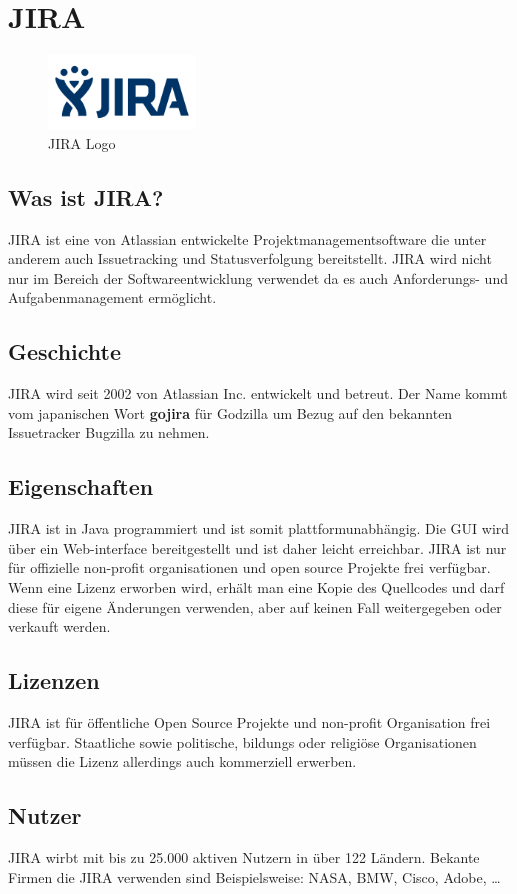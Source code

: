 \section{JIRA}
\begin{figure}[htbp]
        \centering
                \includegraphics[width=0.35\textwidth]{./JIRA_logo.png}
        \caption{JIRA Logo}
\end{figure}
\subsection{Was ist JIRA?}
	JIRA ist eine von Atlassian entwickelte Projektmanagementsoftware die unter anderem auch Issuetracking und Statusverfolgung bereitstellt. JIRA wird nicht nur im Bereich der Softwareentwicklung verwendet da es auch Anforderungs- und Aufgabenmanagement ermöglicht.
\subsection{Geschichte}
	JIRA wird seit 2002 von Atlassian Inc. entwickelt und betreut. Der Name kommt vom japanischen Wort \textbf{gojira} für Godzilla um Bezug auf den bekannten Issuetracker Bugzilla zu nehmen. 
\subsection{Eigenschaften}
JIRA ist in Java programmiert und ist somit plattformunabhängig. Die GUI wird über ein Web-interface bereitgestellt und ist daher leicht erreichbar. JIRA ist nur für offizielle non-profit organisationen und open source Projekte frei verfügbar. Wenn eine Lizenz erworben wird, erhält man eine Kopie des Quellcodes und darf diese für eigene Änderungen verwenden, aber auf keinen Fall weitergegeben oder verkauft werden.
\subsection{Lizenzen}
JIRA ist für öffentliche Open Source Projekte und non-profit Organisation frei verfügbar. Staatliche sowie politische, bildungs oder religiöse Organisationen müssen die Lizenz allerdings auch kommerziell erwerben.
\subsection{Nutzer}
	JIRA wirbt mit bis zu 25.000 aktiven Nutzern in über 122 Ländern. Bekante Firmen die JIRA verwenden sind Beispielsweise: NASA, BMW, Cisco, Adobe, \dots
